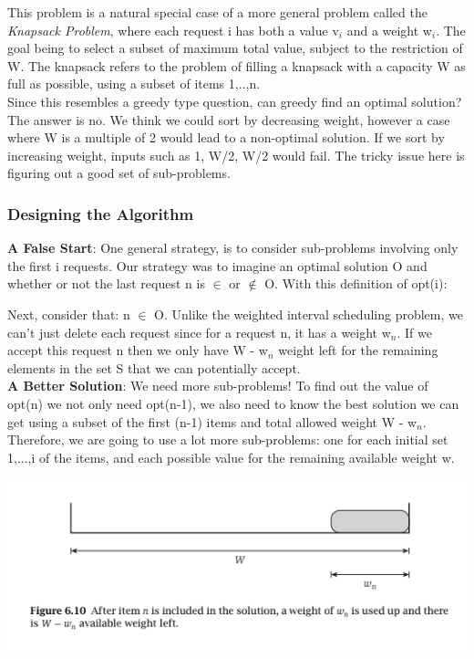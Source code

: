 \documentclass{article}
\begin{document}
This problem is a natural special case of a more general problem called the \emph{Knapsack Problem}, where each request i has both a value v$_i$ and a weight w$_i$. The goal being to select a subset of maximum total value, subject to the restriction of W. The knapsack refers to the problem of filling a knapsack with a capacity W as full as possible, using a subset of items {1,..,n}.\\

Since this resembles a greedy type question, can greedy find an optimal solution? The answer is no. We think we could sort by decreasing weight, however a case where W is a multiple of 2 would lead to a non-optimal solution. If we sort by increasing weight, inputs such as {1, W/2, W/2} would fail. The tricky issue here is figuring out a good set of sub-problems.

\subsubsection{Designing the Algorithm}
\textbf{A False Start}: One general strategy, is to consider sub-problems involving only the first i requests. Our strategy was to imagine an optimal solution O and whether or not the last request n is $\in$ or $\notin$ O. With this definition of opt(i):\\

\begin{center}
\end{center}

Next, consider that: n $\in$ O. Unlike the weighted interval scheduling problem, we can't just delete each request since for a request n, it has a weight w$_n$. If we accept this request n then we only have W - w$_n$ weight left for the remaining elements in the set S that we can potentially accept.\\

\textbf{A Better Solution}: We need more sub-problems! To find out the value of opt(n) we not only need opt(n-1), we also need to know the best solution we can get using a subset of the first (n-1) items and total allowed weight W - w$_n$. Therefore, we are going to use a lot more sub-problems: one for each initial set {1,...,i} of the items, and each possible value for the remaining available weight w.\\

\begin{center}
    \includegraphics[]{figures/fig15.png}
\end{center}
\end{document}
